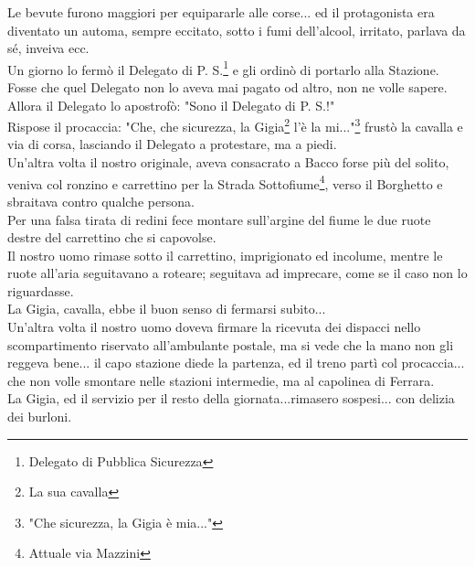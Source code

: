 \documentclass[10pt]{memoir} %
\begin{document}
Le bevute furono maggiori per equipararle alle corse... ed il protagonista era diventato un automa, sempre eccitato, sotto i fumi dell'alcool, irritato, parlava da sé, inveiva ecc.\\
Un giorno lo fermò il Delegato di P. S.\footnote{Delegato di Pubblica Sicurezza} e gli ordinò di portarlo alla Stazione. Fosse che quel Delegato non lo aveva mai pagato od altro, non ne volle sapere.\\
Allora il Delegato lo apostrofò: "Sono il Delegato di P. S.!"\\
Rispose il procaccia: "Che, che sicurezza, la Gigia\footnote{La sua cavalla} l'è la mi..."\footnote{"Che sicurezza, la Gigia è mia..."} frustò la cavalla e via di corsa, lasciando il Delegato a protestare, ma a piedi.\\
Un'altra volta il nostro originale, aveva consacrato a Bacco forse più del solito, veniva col ronzino e carrettino per la Strada Sottofiume\footnote{Attuale via Mazzini}, verso il Borghetto e sbraitava contro qualche persona.\\
Per una falsa tirata di redini fece montare sull'argine del fiume le due ruote destre del carrettino che si capovolse.\\
Il nostro uomo rimase sotto il carrettino, imprigionato ed incolume, mentre le ruote all'aria seguitavano a roteare; seguitava ad imprecare, come se il caso non lo riguardasse.\\
La Gigia, cavalla, ebbe il buon senso di fermarsi subito...\\
Un'altra volta il nostro uomo doveva firmare la ricevuta dei dispacci nello scompartimento riservato all'ambulante postale, ma si vede che la mano non gli reggeva bene... il capo stazione diede la partenza, ed il treno partì col procaccia... che non volle smontare nelle stazioni intermedie, ma al capolinea di Ferrara.\\
La Gigia, ed il servizio per il resto della giornata...rimasero sospesi... con delizia dei burloni. \\

\end{document}
